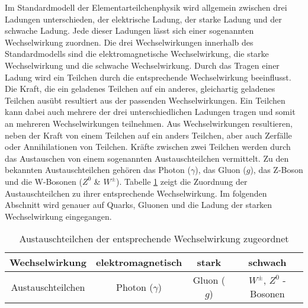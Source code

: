 Im Standardmodell der Elementarteilchenphysik wird allgemein zwischen drei Ladungen unterschieden, der elektrische Ladung, der starke Ladung und der schwache Ladung.
Jede dieser Ladungen l\"asst sich einer sogenannten Wechselwirkung zuordnen.
Die drei Wechselwirkungen innerhalb des Standardmodells sind die elektromagnetische Wechselwirkung, die starke Wechselwirkung und die schwache Wechselwirkung.
Durch das Tragen einer Ladung wird ein Teilchen durch die entsprechende Wechselwirkung beeinflusst.
Die Kraft, die ein geladenes Teilchen auf ein anderes, gleichartig geladenes Teilchen aus\"ubt resultiert aus der passenden Wechselwirkungen.
Ein Teilchen kann dabei auch mehrere der drei unterschiedlichen Ladungen tragen und somit an mehreren Wechselwirkungen teilnehmen.
Aus Wechselwirkungen resultieren, neben der Kraft von einem Teilchen auf ein anders Teilchen, aber auch Zerf\"alle oder Annihilationen von Teilchen.
\newline
Kr\"afte zwischen zwei Teilchen werden durch das Austauschen von einem sogenannten Austauschteilchen vermittelt.
Zu den bekannten Austauschteilchen geh\"oren das Photon ($\gamma$), das Gluon ($g$), das Z-Boson und die W-Bosonen ($Z^{0}$ \& $W^{\pm}$).
Tabelle \ref{tab:Austeilchen} zeigt die Zuordnung der Austauschteilchen zu ihrer entsprechende Wechselwirkung.
Im folgenden Abschnitt wird genauer auf Quarks, Gluonen und die Ladung der starken Wechselwirkung eingegangen.

\begin{table}[h]
\centering
\begin{tabular}{|c||c|c|c|}
\hline
Wechselwirkung    & elektromagnetisch & stark       & schwach                      \\ \hline
Austauschteilchen & Photon ($\gamma$) & Gluon ($g$) & $W^{\pm}$, $Z^{0}$ - Bosonen \\ \hline
\end{tabular}
\caption{Austauschteilchen der entsprechende Wechselwirkung zugeordnet}
\label{tab:Austeilchen}
\end{table}
